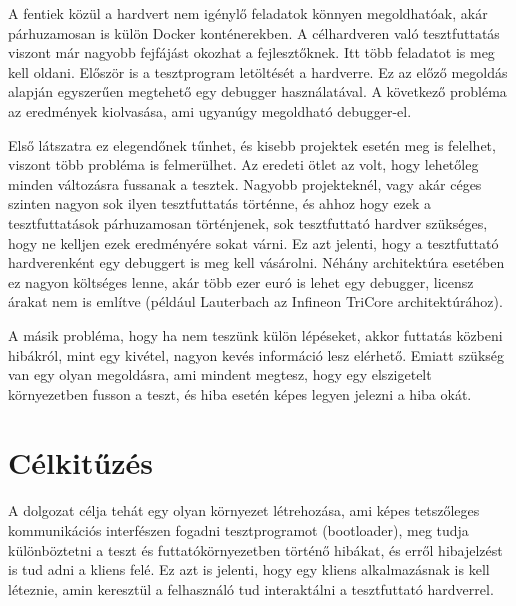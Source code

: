 A fentiek közül a hardvert nem igénylő feladatok könnyen megoldhatóak, akár párhuzamosan is külön Docker konténerekben. A célhardveren való tesztfuttatás viszont már nagyobb fejfájást okozhat a fejlesztőknek. Itt több feladatot is meg kell oldani. Először is a tesztprogram letöltését a hardverre. Ez az előző megoldás alapján egyszerűen megtehető egy debugger használatával. A következő probléma az eredmények kiolvasása, ami ugyanúgy megoldható debugger-el. 

Első látszatra ez elegendőnek tűnhet, és kisebb projektek esetén meg is felelhet, viszont több probléma is felmerülhet. Az eredeti ötlet az volt, hogy lehetőleg minden változásra fussanak a tesztek. Nagyobb projekteknél, vagy akár céges szinten nagyon sok ilyen tesztfuttatás történne, és ahhoz hogy ezek a tesztfuttatások párhuzamosan történjenek, sok tesztfuttató hardver szükséges, hogy ne kelljen ezek eredményére sokat várni. Ez azt jelenti, hogy a tesztfuttató hardverenként egy debuggert is meg kell vásárolni. Néhány architektúra esetében ez nagyon költséges lenne, akár több ezer euró is lehet egy debugger, licensz árakat nem is említve (például Lauterbach az Infineon TriCore architektúrához).

A másik probléma, hogy ha nem teszünk külön lépéseket, akkor futtatás közbeni hibákról, mint egy kivétel, nagyon kevés információ lesz elérhető. Emiatt szükség van egy olyan megoldásra, ami mindent megtesz, hogy egy elszigetelt környezetben fusson a teszt, és hiba esetén képes legyen jelezni a hiba okát.

\section*{Célkitűzés}

A dolgozat célja tehát egy olyan környezet létrehozása, ami képes tetszőleges kommunikációs interfészen fogadni tesztprogramot (bootloader), meg tudja különböztetni a teszt és futtatókörnyezetben történő hibákat, és erről hibajelzést is tud adni a kliens felé. Ez azt is jelenti, hogy egy kliens alkalmazásnak is kell léteznie, amin keresztül a felhasználó tud interaktálni a tesztfuttató hardverrel.